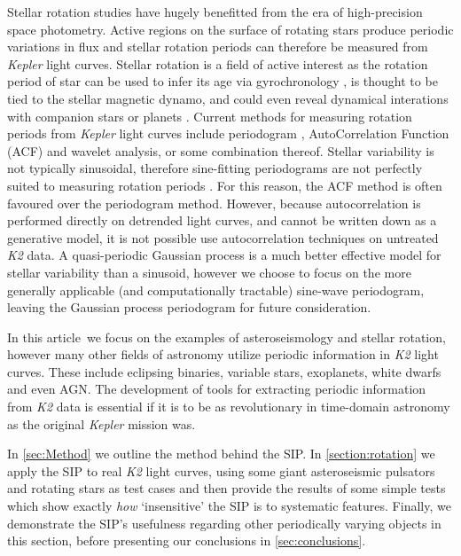 \documentclass[useAMS, usenatbib, preprint, 12pt]{aastex}
\newcommand{\article}{article}
\begin{document}
Stellar rotation studies have hugely benefitted from the era of high-precision
space photometry.
Active regions on the surface of rotating stars produce periodic variations
in flux and stellar rotation periods can therefore be measured from
{\it Kepler} light curves.
Stellar rotation is a field of active interest as the rotation period of star
can be used to infer its age via gyrochronology
\citep{Skumanich1972, Barnes2007, Epstein2014, Angus2015}, is thought to be
tied to the stellar magnetic dynamo, and could even reveal dynamical
interations with companion stars or planets
\citep[e.g.][]{Beky2014, Poppenhaeger2014}.
Current methods for measuring rotation periods from {\it Kepler} light curves
include periodogram \citep[e.g.][]{Reinhold2013}, AutoCorrelation Function
(ACF) \citep{McQuillan2013} and wavelet \citep[e.g.][]{Garcia2014} analysis,
or some combination thereof.
Stellar variability is not typically sinusoidal, therefore sine-fitting
periodograms are not perfectly suited to measuring rotation periods
\citep{McQuillan2013}.
For this reason, the ACF method is often favoured over the periodogram method.
However, because autocorrelation is performed directly on detrended light
curves, and cannot be written down as a generative model, it is not possible
use autocorrelation techniques on untreated {\it K2} data.
A quasi-periodic Gaussian process is a much better effective model for stellar
variability than a sinusoid, however we choose to focus on the more generally
applicable (and computationally tractable) sine-wave periodogram, leaving the
Gaussian process periodogram for future consideration.

In this \article\ we focus on the examples of asteroseismology and stellar
rotation, however many other fields of astronomy utilize periodic information
in {\it K2} light curves.
These include eclipsing binaries, variable stars, exoplanets, white dwarfs and
even AGN.
The development of tools for extracting periodic information from {\it K2}
data is essential if it is to be as revolutionary in time-domain
astronomy as the original {\it Kepler} mission was.

In \textsection\ref{sec:Method} we outline the method behind the SIP.
In \textsection\ref{section:rotation} we apply the SIP to real {\it K2} light
curves, using some giant asteroseismic pulsators and rotating stars as test
cases and then provide the results of some simple tests which show exactly
{\it how} `insensitive' the SIP is to systematic features.
Finally, we demonstrate the SIP's usefulness regarding other periodically
varying objects in this section, before presenting our conclusions in
\textsection\ref{sec:conclusions}.
\end{document}
